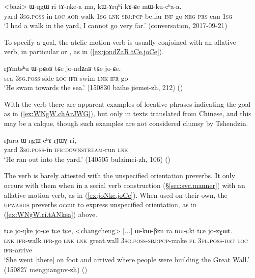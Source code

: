 \begin{exe}
\ex \label{ex:WNgW.ri.tANkea}
\gll <bazi> ɯ-ŋgɯ ri tɤ-ŋke-a ma, kɯ-ɤrqʰi kɤ-ɕe mɯ-ku-cʰa-a. \\
yard \textsc{3sg}.\textsc{poss}-in \textsc{loc} \textsc{aor}-walk-\textsc{1sg} \textsc{lnk} \textsc{sbj}:\textsc{pcp}-be.far \textsc{inf}-go \textsc{neg}-\textsc{prs}-can-\textsc{1sg} \\
\glt `I had a walk in the yard, I cannot go very far.' (conversation, 2017-09-21)
\end{exe}

To specify a goal, the atelic motion verb is usually conjoined with an allative verb, in particular  or , as in (\ref{ex:jondZaR.tCe.joCe}).

\begin{exe}
\ex \label{ex:jondZaR.tCe.joCe}
\gll rɟɤmtsʰu ɯ-pɕoʁ tɕe jo-ndʑaʁ tɕe jo-ɕe. \\
sea \textsc{3sg}.\textsc{poss}-side \textsc{loc} \textsc{ifr}-swim \textsc{lnk} \textsc{ifr}-go \\
\glt `He swam towards the sea.' (150830 baihe jiemei-zh, 212)
()
\end{exe}

With the verb  there are apparent examples of locative phrases indicating the goal as in (\ref{ex:WNgW.chArJWG}), but only in texts translated from Chinese, and this may be a calque, though such examples are not considered clumsy by Tshendzin.

\begin{exe}
\ex \label{ex:WNgW.chArJWG}
\gll  rɟara ɯ-ŋgɯ cʰɤ-rɟɯɣ ri, \\
yard \textsc{3sg}.\textsc{poss}-in \textsc{ifr}:\textsc{downstream}-run \textsc{lnk} \\
\glt `He ran out into the yard.' (140505 bulaimei-zh, 106) ()
\end{exe} 

The verb  is barely attested with the unspecified orientation preverbs. It only occurs with them when in a serial verb construction (§\ref{sec:svc.manner}) with an allative motion verb, as in (\ref{ex:joNke.joCe}). When used on their own, the \textsc{upwards} preverbs occur to express unspecified orientation, as in (\ref{ex:WNgW.ri.tANkea}) above.

\begin{exe}
\ex \label{ex:joNke.joCe}
\gll tɕe jo-ŋke jo-ɕe tɕe tɕe, <changcheng> [...] ɯ-kɯ-βzu ra nɯ-ɕki tɕe jo-zɣɯt. \\
\textsc{lnk} \textsc{ifr}-walk \textsc{ifr}-go \textsc{lnk} \textsc{lnk} great.wall {  } \textsc{3sg}.\textsc{poss}-\textsc{sbj}:\textsc{pcp}-make \textsc{pl} \textsc{3pl}.\textsc{poss}-\textsc{dat} \textsc{loc} \textsc{ifr}-arrive \\
\glt `She went [there] on foot and arrived where people were building the Great Wall.' (150827 mengjiangnv-zh) ()
\end{exe}

